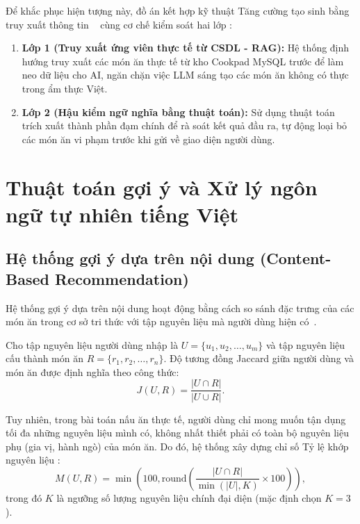 Để khắc phục hiện tượng này, đồ án kết hợp kỹ thuật Tăng cường tạo sinh bằng truy xuất thông tin ~\cite{Lewis2020RAG} cùng cơ chế kiểm soát hai lớp :
\begin{enumerate}[leftmargin=1.6em, itemsep=2pt]
  \item \textbf{Lớp 1 (Truy xuất ứng viên thực tế từ CSDL - RAG):} Hệ thống định hướng truy xuất các món ăn thực tế từ kho Cookpad MySQL trước để làm neo dữ liệu cho AI, ngăn chặn việc LLM sáng tạo các món ăn không có thực trong ẩm thực Việt.
  \item \textbf{Lớp 2 (Hậu kiểm ngữ nghĩa bằng thuật toán):} Sử dụng thuật toán trích xuất thành phần đạm chính  để rà soát kết quả đầu ra, tự động loại bỏ các món ăn vi phạm trước khi gửi về giao diện người dùng.
\end{enumerate}

\section{Thuật toán gợi ý và Xử lý ngôn ngữ tự nhiên tiếng Việt}

\subsection{Hệ thống gợi ý dựa trên nội dung (Content-Based Recommendation)}

Hệ thống gợi ý dựa trên nội dung hoạt động bằng cách so sánh đặc trưng của các món ăn trong cơ sở tri thức với tập nguyên liệu mà người dùng hiện có~\cite{Adomavicius2005, Trattner2017}.

Cho tập nguyên liệu người dùng nhập là $U = \{u_1, u_2, \dots, u_m\}$ và tập nguyên liệu cấu thành món ăn $R = \{r_1, r_2, \dots, r_n\}$. Độ tương đồng Jaccard giữa người dùng và món ăn được định nghĩa theo công thức:
\begin{equation}
J(U, R) = \frac{|U \cap R|}{|U \cup R|}.
\label{eq:jaccard}
\end{equation}

Tuy nhiên, trong bài toán nấu ăn thực tế, người dùng chỉ mong muốn tận dụng tối đa những nguyên liệu mình có, không nhất thiết phải có toàn bộ nguyên liệu phụ (gia vị, hành ngò) của món ăn. Do đó, hệ thống xây dựng chỉ số Tỷ lệ khớp nguyên liệu :
\begin{equation}
M(U, R) = \min\left(100, \mathrm{round}\left(\frac{|U \cap R|}{\min(|U|, K)} \times 100\right)\right),
\label{eq:match_score}
\end{equation}
trong đó $K$ là ngưỡng số lượng nguyên liệu chính đại diện (mặc định chọn $K = 3$).

